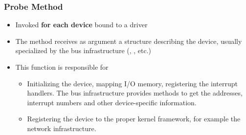 \begin{frame}
  \frametitle{Probe Method}
  \begin{itemize}
  \item Invoked {\bf for each device} bound to a driver
  \item The  method receives as argument a structure
    describing the device, usually specialized by the bus
    infrastructure (, , etc.)
  \item This function is responsible for
    \begin{itemize}
    \item Initializing the device, mapping I/O memory, registering the
      interrupt handlers. The bus infrastructure provides methods to
      get the addresses, interrupt numbers and other device-specific
      information.
    \item Registering the device to the proper kernel framework, for
      example the network infrastructure.
    \end{itemize}
  \end{itemize}
\end{frame}

